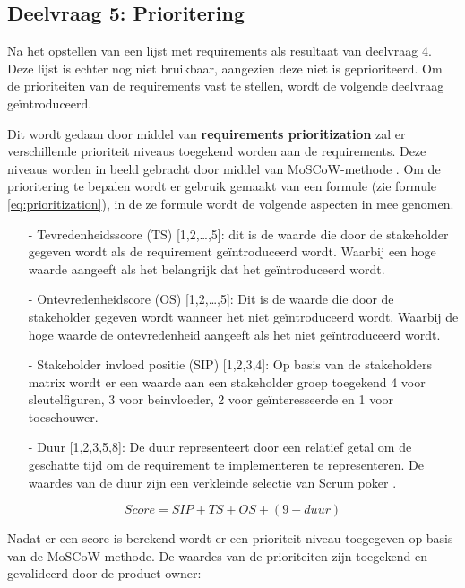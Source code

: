 \subsection{Deelvraag 5: Prioritering}
Na het opstellen van een lijst met requirements als resultaat van deelvraag 4.
Deze lijst is echter nog niet bruikbaar, aangezien deze niet is geprioriteerd.
Om de prioriteiten van de requirements vast te stellen, wordt de volgende deelvraag geïntroduceerd.

\begin{center}
	\textit{\SubquestionFive}
\end{center}

\whitespace[0.2]
Dit wordt gedaan door middel van \textbf{requirements prioritization} zal er verschillende prioriteit niveaus toegekend worden aan de requirements.
Deze niveaus worden in beeld gebracht door middel van MoSCoW-methode \Parencite{MoSCoW}.
Om de prioritering te bepalen wordt er gebruik gemaakt van een formule (zie formule \ref{eq:prioritization}), in de ze formule wordt de volgende aspecten in mee genomen.
\begin{enumerate}
	\item[-] Tevredenheidsscore (TS) [1,2,\ldots,5]: dit is de waarde die door de stakeholder gegeven wordt als de requirement geïntroduceerd wordt. Waarbij een hoge waarde aangeeft als het belangrijk dat het geïntroduceerd wordt.
	\item[-] Ontevredenheidscore (OS) [1,2,\dots,5]: Dit is de waarde die door de stakeholder gegeven wordt wanneer het niet geïntroduceerd wordt. Waarbij de hoge waarde de ontevredenheid aangeeft als het niet geïntroduceerd wordt.
	\item[-] Stakeholder invloed positie (SIP) [1,2,3,4]: Op basis van de stakeholders matrix wordt er een waarde aan een stakeholder groep toegekend 4 voor sleutelfiguren, 3 voor beinvloeder, 2 voor geïnteresseerde en 1 voor toeschouwer.
	\item[-] Duur [1,2,3,5,8]: De duur representeert door een relatief getal om de geschatte tijd om de requirement te implementeren te representeren.
	      De waardes van de duur zijn een verkleinde selectie van Scrum poker \Parencite{ScrumPoker}.
\end{enumerate}

\whitespace
\begin{equation}
	\label{eq:prioritization}
	Score = SIP + TS + OS + (9 - duur)
\end{equation}

\whitespace
Nadat er een score is berekend wordt er een prioriteit niveau toegegeven op basis van de MoSCoW methode.
De waardes van de prioriteiten zijn toegekend en gevalideerd door de product owner:

